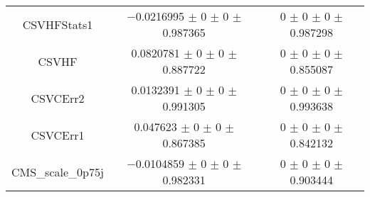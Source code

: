 \begin{table}
\begin{tabular}{ccc}
CSVHFStats1 	& \num{-0.0216995} $\pm$ \num{0} $\pm$ \num{0} $\pm$ \num{0.987365} 	& \num{0} $\pm$ \num{0} $\pm$ \num{0} $\pm$ \num{0.987298}\\
CSVHF 	& \num{0.0820781} $\pm$ \num{0} $\pm$ \num{0} $\pm$ \num{0.887722} 	& \num{0} $\pm$ \num{0} $\pm$ \num{0} $\pm$ \num{0.855087}\\
CSVCErr2 	& \num{0.0132391} $\pm$ \num{0} $\pm$ \num{0} $\pm$ \num{0.991305} 	& \num{0} $\pm$ \num{0} $\pm$ \num{0} $\pm$ \num{0.993638}\\
CSVCErr1 	& \num{0.047623} $\pm$ \num{0} $\pm$ \num{0} $\pm$ \num{0.867385} 	& \num{0} $\pm$ \num{0} $\pm$ \num{0} $\pm$ \num{0.842132}\\
CMS\_scale\_0p75j 	& \num{-0.0104859} $\pm$ \num{0} $\pm$ \num{0} $\pm$ \num{0.982331} 	& \num{0} $\pm$ \num{0} $\pm$ \num{0} $\pm$ \num{0.903444}\\
\bottomrule
\end{tabular}
\end{table}
